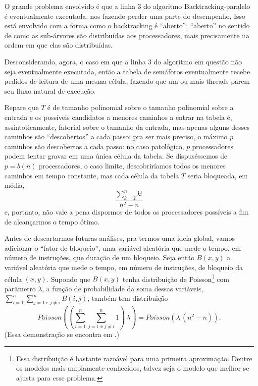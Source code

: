 \documentclass[a4paper,article,10pt]{article}
\newcommand{\e}{\textsf{ e }}
\newcommand{\parenteses}[1] {\left ( {#1} \right )}
\begin{document}
    O grande problema envolvido é que a linha $3$ do algoritmo
    {\sc Backtracking-paralelo} é eventualmente executada, nos fazendo perder
    uma parte do desempenho. Isso está envolvido com a forma como o backtracking
    é ``aberto''; ``aberto'' no sentido de como as sub-árvores são distribuídas
    aos processadores, mais precisamente na ordem em que elas são distribuídas.
    
    Desconsiderando, agora, o caso em que a linha $3$ do algoritmo em questão
    não seja eventualmente executada, então a tabela de semáforos eventualmente
    recebe pedidos de leitura de uma mesma célula, fazendo que um ou mais
    threads parem seu fluxo natural de execução.

    Repare que $T$ é de tamanho polinomial sobre o tamanho polinomial sobre a
    entrada e os possíveis candidatos a menores caminhos a entrar na tabela é,
    assintoticamente, fatorial sobre o tamanho da entrada, mas apenas alguns
    desses caminhos são ``descobertos'' a cada passo; pra ser mais preciso, o
    máximo $p$ caminhos são descobertos a cada passo: no caso patológico, $p$
    processadores podem tentar gravar em uma única célula da tabela.
    Se dispuséssemos de $p=b(n)$ processadores, o caso limite, descobriríamos
    todos os menores caminhos em tempo constante, mas cada célula da tabela $T$
    seria bloqueada, em média,
    \begin{equation*}
      \frac{\sum_{k=2}^n k!}{n^2 - n}
    \end{equation*}
    e, portanto, não vale a pena dispormos de todos os processadores possíveis
    a fim de alcançarmos o tempo ótimo.

    Antes de descartarmos futuras análises, pra termos uma ideia global, vamos
    adicionar o ``fator de bloqueio'', uma variável aleatória que mede o tempo,
    em número de instruções, que duração de um bloqueio. Seja então $B(x,y)$ a
    variável aleatória que mede o tempo, em número de instruções, de bloqueio da
    célula $(x,y)$.
    Supondo que $B(x,y)$ tenha distribuição de Poisson\footnote{Essa
      distribuição é bastante razoável para uma primeira aproximação. Dentre os
      modelos mais amplamente conhecidos, talvez seja o modelo que melhor se
      ajusta para esse problema.} com parâmetro $\lambda$, a função de
    probabilidade da soma dessas variáveis,
    $\sum_{i=1}^n \sum_{j=1 \e j\ne i}^n B(i,j)$, também tem distribuição
    \begin{equation*}
      Poisson\parenteses{\parenteses{\sum_{i=1}^n \sum_{j=1 \e j\ne i}^n
          1}\,\lambda} 
      =
      Poisson\parenteses{\lambda\,(n^2 - n)}.
    \end{equation*}
    (Essa demonstração se encontra em \citealp[pg.~286-287]{Magalhaes11}.)
\end{document}
